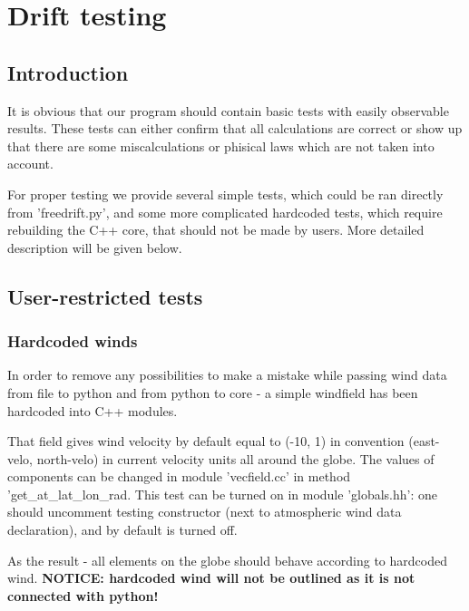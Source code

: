 
\chapter{Drift testing}


\section{Introduction}

It is obvious that our program should contain basic tests with easily 
observable results. These tests can either confirm that all calculations
are correct or show up that there are some miscalculations or phisical
laws which are not taken into account.

For proper testing we provide several simple tests, which could be ran
directly from 'freedrift.py', and some more complicated hardcoded tests, 
which require rebuilding the C++ core, that should not be made by users. 
More detailed description will be given below.


\section{User-restricted tests}

\subsection{Hardcoded winds}

In order to remove any possibilities to make a mistake while passing 
wind data from file to python and from python to core - a simple windfield 
has been hardcoded into C++ modules.

That field gives wind velocity by default equal to (-10, 1) in convention 
(east-velo, north-velo) in current velocity units all around the globe.
The values of components can be changed in module 'vecfield.cc' in method
'get\_at\_lat\_lon\_rad. This test can be turned on in module 'globals.hh':
one should uncomment testing constructor (next to atmospheric wind data 
declaration), and by default is turned off.

As the result - all elements on the globe should behave according to 
hardcoded wind. \textbf{NOTICE: hardcoded wind will not be outlined as
it is not connected with python!}

